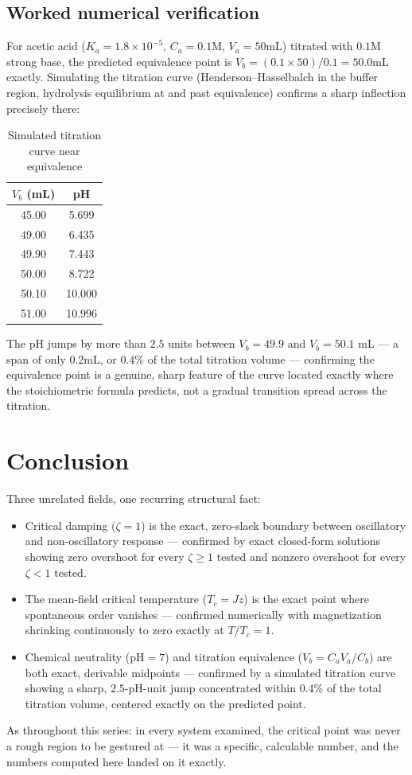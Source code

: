 \documentclass[10pt,journal,compsoc]{IEEEtran}
\begin{document}
\subsection{Worked numerical verification}
For acetic acid ($K_a=1.8\times10^{-5}$, $C_a=0.1$M, $V_a=50$mL) titrated with $0.1$M strong base, the predicted equivalence point is $V_b=(0.1\times50)/0.1=50.0$mL exactly. Simulating the titration curve (Henderson--Hasselbalch in the buffer region, hydrolysis equilibrium at and past equivalence) confirms a sharp inflection precisely there:

\begin{table}[h]
\centering
\caption{Simulated titration curve near equivalence}
\begin{tabular}{cc}
\toprule
$V_b$ (mL) & pH \\
\midrule
45.00 & 5.699 \\
49.00 & 6.435 \\
49.90 & 7.443 \\
50.00 & 8.722 \\
50.10 & 10.000 \\
51.00 & 10.996 \\
\bottomrule
\end{tabular}
\end{table}

The pH jumps by more than $2.5$ units between $V_b=49.9$ and $V_b=50.1$ mL — a span of only $0.2$mL, or $0.4\%$ of the total titration volume — confirming the equivalence point is a genuine, sharp feature of the curve located exactly where the stoichiometric formula predicts, not a gradual transition spread across the titration.

\section{Conclusion}
Three unrelated fields, one recurring structural fact:
\begin{itemize}
    \item Critical damping ($\zeta=1$) is the exact, zero-slack boundary between oscillatory and non-oscillatory response — confirmed by exact closed-form solutions showing zero overshoot for every $\zeta\ge1$ tested and nonzero overshoot for every $\zeta<1$ tested.
    \item The mean-field critical temperature ($T_c=Jz$) is the exact point where spontaneous order vanishes — confirmed numerically with magnetization shrinking continuously to zero exactly at $T/T_c=1$.
    \item Chemical neutrality (pH$=7$) and titration equivalence ($V_b=C_aV_a/C_b$) are both exact, derivable midpoints — confirmed by a simulated titration curve showing a sharp, $2.5$-pH-unit jump concentrated within $0.4\%$ of the total titration volume, centered exactly on the predicted point.
\end{itemize}
As throughout this series: in every system examined, the critical point was never a rough region to be gestured at — it was a specific, calculable number, and the numbers computed here landed on it exactly.
\end{document}
